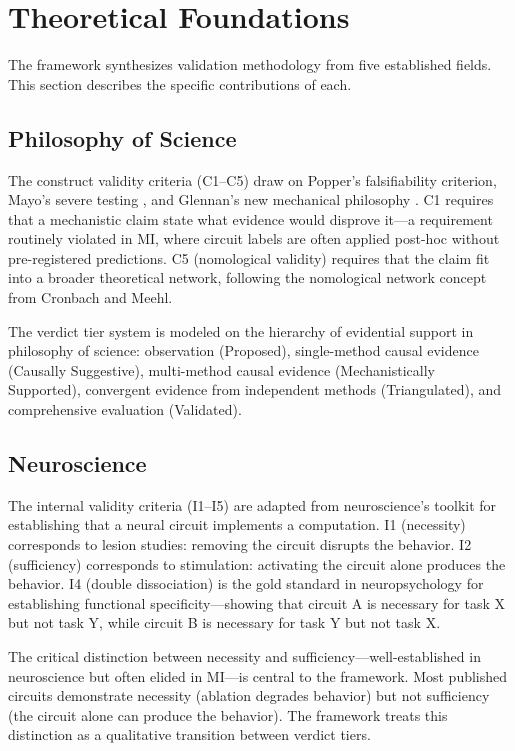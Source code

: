 \documentclass[10pt]{article}
\begin{document}
\section{Theoretical Foundations}
\label{sec:foundations}

The framework synthesizes validation methodology from five established fields. This section describes the specific contributions of each.

\subsection{Philosophy of Science}
\label{sec:phil-sci}

The construct validity criteria (C1--C5) draw on Popper's falsifiability criterion, Mayo's severe testing \citep{mayo2018statistical}, and Glennan's new mechanical philosophy \citep{glennan2017new}. C1 requires that a mechanistic claim state what evidence would disprove it---a requirement routinely violated in MI, where circuit labels are often applied post-hoc without pre-registered predictions. C5 (nomological validity) requires that the claim fit into a broader theoretical network, following the nomological network concept from Cronbach and Meehl.

The verdict tier system is modeled on the hierarchy of evidential support in philosophy of science: observation (Proposed), single-method causal evidence (Causally Suggestive), multi-method causal evidence (Mechanistically Supported), convergent evidence from independent methods (Triangulated), and comprehensive evaluation (Validated).

\subsection{Neuroscience}
\label{sec:neuro}

The internal validity criteria (I1--I5) are adapted from neuroscience's toolkit for establishing that a neural circuit implements a computation. I1 (necessity) corresponds to lesion studies: removing the circuit disrupts the behavior. I2 (sufficiency) corresponds to stimulation: activating the circuit alone produces the behavior. I4 (double dissociation) is the gold standard in neuropsychology for establishing functional specificity---showing that circuit A is necessary for task X but not task Y, while circuit B is necessary for task Y but not task X.

The critical distinction between necessity and sufficiency---well-established in neuroscience but often elided in MI---is central to the framework. Most published circuits demonstrate necessity (ablation degrades behavior) but not sufficiency (the circuit alone can produce the behavior). The framework treats this distinction as a qualitative transition between verdict tiers.
\end{document}
